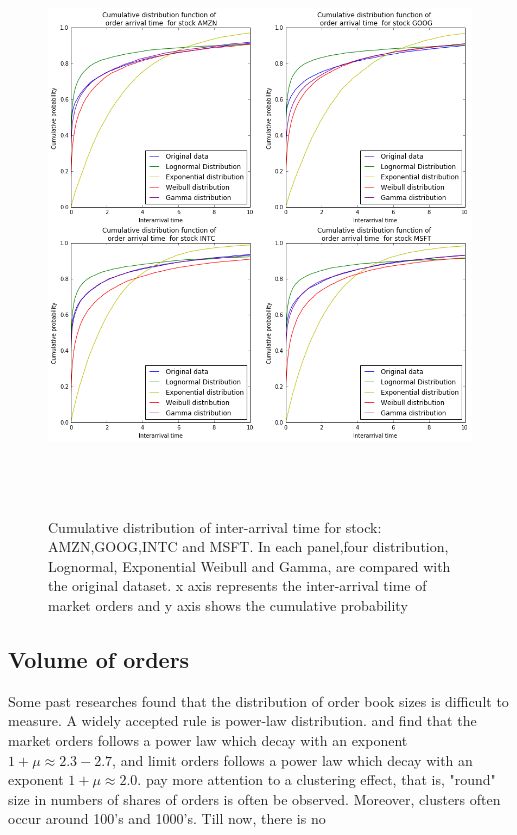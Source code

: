 \begin{figure}[hbtp]
  \begin{center}
    \includegraphics[width=6in,height=6in]{figures/arrival_time.png}
  \end{center}
\caption{Cumulative distribution of inter-arrival time for stock: AMZN,GOOG,INTC and MSFT. In each panel,four distribution, Lognormal, Exponential Weibull and Gamma, are compared with the original dataset. x axis represents the inter-arrival time of market orders and y axis shows the cumulative probability } \label{fig:arrival}
\end{figure}


\subsection{Volume of orders}
Some past researches found that the distribution of order book sizes is difficult to measure. A widely accepted rule is power-law distribution.\cite{gopikrishnan2000statistical} and \cite{maslov2001price} find that the market orders follows a power law which decay with an exponent $1+\mu\approx2.3-2.7$, and limit orders follows a power law which decay with an exponent $1+\mu \approx 2.0$. \cite{challet2001analyzing} pay more attention to a clustering effect, that is, "round" size in numbers of shares of orders is often be observed. Moreover, clusters often occur around 100's and 1000's. Till now, there is no 
